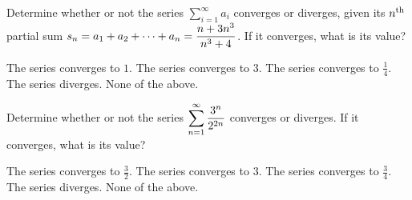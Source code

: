 \documentclass[12pt]{exam}
\newcommand{\ds}{\ensuremath{\displaystyle}}
\begin{document}
\begin{center}
\end{center}
\vspace{0.1in}

\begin{questions}

\setcounter{question}{0}
\question[10]
Determine whether or not the series $\sum_{i=1}^\infty a_i$ converges or
diverges, given its $n^{\rm th}$ partial sum
$\ds s_n = a_1 + a_2 + \cdots + a_n = \frac{n+3n^3}{n^3+4}$. If it converges,
what is its value?

\begin{checkboxes}
\choice The series converges to $1$.
\CorrectChoice The series converges to $3$.
\choice The series converges to $\frac{1}{4}$.
\choice The series diverges.
\choice None of the above.
\end{checkboxes}

\vfill

\question[10]
Determine whether or not the series $\ds\sum_{n=1}^\infty \frac{3^n}{2^{2n}}$
converges or diverges. If it converges, what is its value?

\begin{checkboxes}
\choice The series converges to $\frac{3}{2}$.
\CorrectChoice The series converges to $3$.
\choice The series converges to $\frac{3}{4}$.
\choice The series diverges.
\choice None of the above.
\end{checkboxes}

\vfill

\end{questions}
\end{document}
